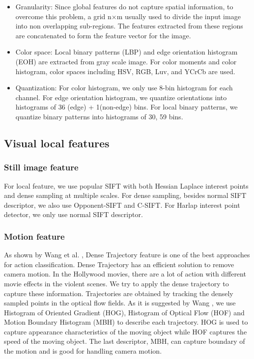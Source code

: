 \documentclass[review]{elsarticle}
\begin{document}
\begin{itemize}
	\item Granularity:  Since global features do not capture spatial information, to overcome this problem, a grid n×m usually used to divide the input image into non overlapping sub-regions. The features extracted from these regions are concatenated to form the feature vector for the image.
	\item Color space: Local binary patterns (LBP) and edge orientation histogram (EOH) are extracted from gray scale image. For color moments and color histogram, color spaces including HSV, RGB, Luv, and YCrCb are used.
	\item Quantization: For color histogram, we only use 8-bin histogram for each channel. For edge orientation histogram, we quantize orientations into histograms of 36 (edge) + 1(non-edge) bins. For local binary patterns, we quantize binary patterns into histograms of 30, 59 bins.
\end{itemize}

\subsection{Visual local features}
\subsubsection{Still image feature}

For local feature, we use popular SIFT with both Hessian Laplace interest points and dense sampling at multiple scales. For dense sampling, besides normal SIFT descriptor, we also use Opponent-SIFT and C-SIFT. For Harlap interest point detector, we only use normal SIFT descriptor.	

\subsubsection{Motion feature}
As shown by Wang et al. \cite{wang_dense}, Dense Trajectory feature is one of the best approaches for action classification. Dense Trajectory has an efficient solution to remove camera motion. In the Hollywood movies, there are a lot of action with different movie effects in the violent scenes. We try to apply the dense trajectory  to capture these information. Trajectories are obtained by tracking the densely sampled points in the optical flow fields. As it is suggested by Wang \cite{wang_dense}, we use Histogram of Oriented Gradient (HOG), Histogram of Optical Flow (HOF) and Motion Boundary Histogram (MBH) to describe each trajectory. HOG is used to capture appearance characteristics of the moving object while HOF captures the speed of the moving object. The last descriptor, MBH, can capture boundary of the motion and is good for handling camera motion.
\end{document}

